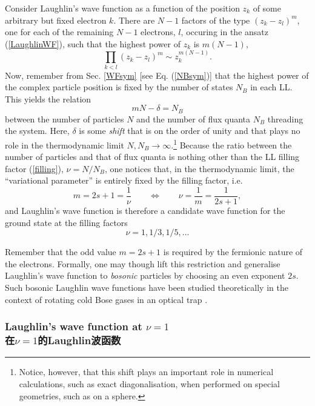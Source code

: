 \documentclass[10pt]{book}
\newcommand{\beq}{\begin{equation}}
\newcommand{\eeq}{\end{equation}}
\begin{document}
Consider Laughlin's wave function as a function of the position $z_k$ of some arbitrary but fixed electron $k$. There are $N-1$ factors
of the type $(z_k - z_l)^m$, one for each of the remaining $N-1$ electrons, $l$, 
occuring in the ansatz (\ref{LaughlinWF}), such that the highest power of $z_k$ is $m(N-1)$,
$$
\prod_{k<l}\left(z_k - z_l\right)^m \sim z_k^{m(N-1)}.
$$
Now, remember from Sec. \ref{WFsym} [see Eq. (\ref{NBsym})] that the highest power of the complex particle position is fixed by 
the number of states $N_B$ in each LL. This yields the relation
\beq\label{N-M}
mN - \delta =N_B
\eeq
between the number of particles $N$ and the number of flux quanta $N_B$ threading the system. Here, $\delta$ is some {\sl shift}
that is on the order of unity and that plays no role in the thermodynamic limit $N,N_B\to \infty$.\footnote{Notice, however,
that this shift plays an important role in numerical calculations, such as exact diagonalisation, when performed on special
geometries, such as on a sphere.}
Because the ratio between the number of particles and that of flux quanta is nothing other than the LL filling factor (\ref{filling}),
$\nu=N/N_B$, one notices that, in the thermodynamic limit, the ``variational parameter'' is entirely fixed by the filling factor,
i.e. 
\beq\label{LaughlinFF}
m=2s+1=\frac{1}{\nu} \qquad \Leftrightarrow \qquad \nu = \frac{1}{m} = \frac{1}{2s+1},
\eeq
and Laughlin's wave function is therefore a candidate wave function for the ground state at the filling factors
$$\nu=1, 1/3,1/5, ...$$

Remember that the odd value $m=2s+1$ is required by the fermionic nature of the electrons. Formally, one may though lift
this restriction and generalise Laughlin's wave function to {\sl bosonic} particles by choosing an even exponent $2s$.
Such bosonic Laughlin wave functions have been studied theoretically in the context of rotating cold Bose gases in an
optical trap \cite{cooper}.

\subsubsection[在$\nu=1$的Laughlin波函数]{Laughlin's wave function at $\nu=1$\\\bf 在$\nu=1$的Laughlin波函数}
\label{FQHEnu1}
\end{document}
